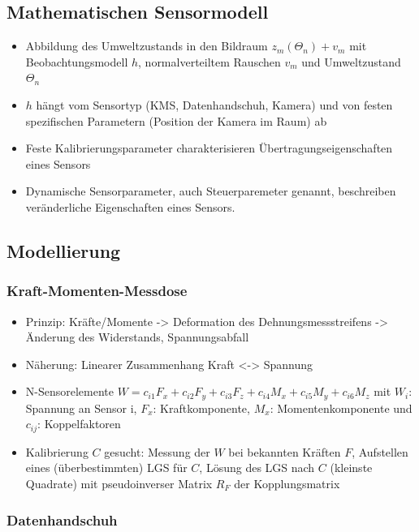 \documentclass[paper=a4, fontsize=11pt]{scrartcl} %
\numberwithin{equation}{section} %
\numberwithin{figure}{section} %
\numberwithin{table}{section} %
\begin{document}
\subsection{Mathematischen Sensormodell}

\begin{itemize}
\item Abbildung des Umweltzustands in den Bildraum $z_m(\Theta_n) + v_m$ mit Beobachtungsmodell $h$, normalverteiltem Rauschen $v_m$ und Umweltzustand $\Theta_n$
\item $h$ hängt vom Sensortyp (KMS, Datenhandschuh, Kamera) und von festen spezifischen Parametern (Position der Kamera im Raum) ab
\item Feste Kalibrierungsparameter charakterisieren Übertragungseigenschaften eines Sensors
\item Dynamische Sensorparameter, auch Steuerparemeter genannt, beschreiben veränderliche Eigenschaften eines Sensors.
\end{itemize}

\subsection{Modellierung}

\subsubsection{Kraft-Momenten-Messdose}

\begin{itemize}
\item Prinzip: Kräfte/Momente -> Deformation des Dehnungsmessstreifens -> Änderung des Widerstands, Spannungsabfall
\item Näherung: Linearer Zusammenhang Kraft <-> Spannung
\item N-Sensorelemente $W = c_{i1} F_x + c_{i2} F_y + c_{i3} F_z + c_{i4} M_x + c_{i5} M_y + c_{i6} M_z$ mit $W_i$: Spannung an Sensor i, $F_x$: Kraftkomponente, $M_x$: Momentenkomponente und $c_{ij}$: Koppelfaktoren
\item Kalibrierung $C$ gesucht: Messung der $W$ bei bekannten Kräften $F$, Aufstellen eines (überbestimmten) LGS für $C$, Lösung des LGS nach $C$ (kleinste Quadrate) mit pseudoinverser Matrix $R_F$ der Kopplungsmatrix
\end{itemize}

\subsubsection{Datenhandschuh}
\end{document}
